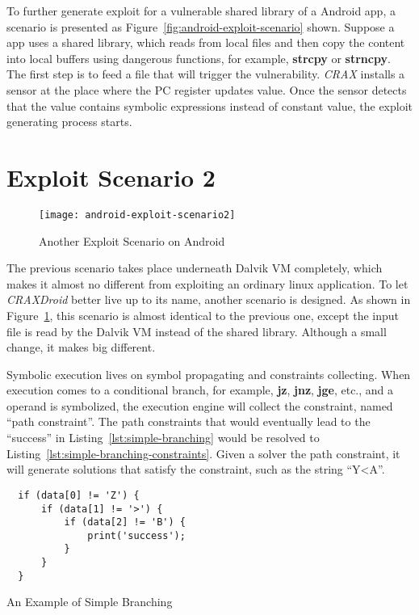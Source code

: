 To further generate exploit for a vulnerable shared library of a Android app, a
scenario is presented as Figure~\ref{fig:android-exploit-scenario} shown.
Suppose a app uses a shared library, which reads from local files and then copy
the content into local buffers using dangerous functions, for example,
\textbf{strcpy} or \textbf{strncpy}. The first step is to feed a file that will
trigger the vulnerability. \emph{CRAX} installs a sensor at the place where the
PC register updates value. Once the sensor detects that the value contains
symbolic expressions instead of constant value, the exploit generating process
starts.

\section{Exploit Scenario 2}

\begin{figure}[!ht]
  \texttt{[image: android-exploit-scenario2]}
  \caption{Another Exploit Scenario on Android}
  \label{fig:android-exploit-scenario2}
\end{figure}

The previous scenario takes place underneath Dalvik VM completely, which makes
it almost no different from exploiting an ordinary linux application. To let
\emph{CRAXDroid} better live up to its name, another scenario is designed. As
shown in Figure~\ref{fig:android-exploit-scenario2}, this scenario is almost
identical to the previous one, except the input file is read by the Dalvik VM
instead of the shared library. Although a small change, it makes big different.

Symbolic execution lives on symbol propagating and constraints collecting. When
execution comes to a conditional branch, for example, \textbf{jz},
\textbf{jnz}, \textbf{jge}, etc., and a operand is symbolized, the execution
engine will collect the constraint, named ``path constraint''. The path
constraints that would eventually lead to the ``success'' in
Listing~\ref{lst:simple-branching} would be resolved to
Listing~\ref{lst:simple-branching-constraints}. Given a solver the path
constraint, it will generate solutions that satisfy the constraint, such as the
string ``Y\textless A''.

\begin{listing}[H]
  \begin{verbatim}
  if (data[0] != 'Z') {
      if (data[1] != '>') {
          if (data[2] != 'B') {
              print('success');
          }
      }
  }
  \end{verbatim}
  \caption{An Example of Simple Branching}
  \label{lst:simple-branching}
\end{listing}

